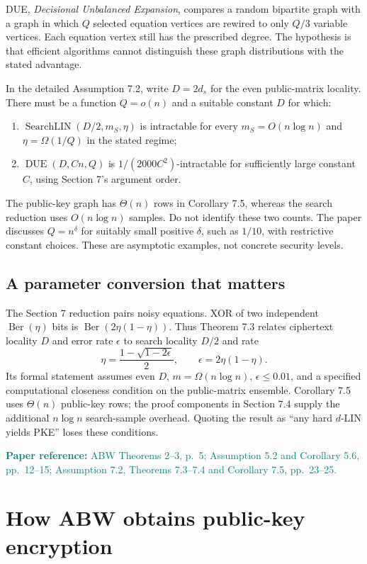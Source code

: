 \documentclass[11pt,a4paper]{article}
\newcommand{\Ber}{\operatorname{Ber}}
\newcommand{\readref}[1]{\textcolor{teal}{\small\textbf{Paper reference:} #1}}
\begin{document}
DUE, \emph{Decisional Unbalanced Expansion}, compares a random bipartite graph with a graph in which $Q$ selected equation vertices are rewired to only $Q/3$ variable vertices. Each equation vertex still has the prescribed degree. The hypothesis is that efficient algorithms cannot distinguish these graph distributions with the stated advantage.

In the detailed Assumption 7.2, write $D=2d_s$ for the even public-matrix locality. There must be a function $Q=o(n)$ and a suitable constant $D$ for which:
\begin{enumerate}
\item $\operatorname{SearchLIN}(D/2,m_S,\eta)$ is intractable for every $m_S=O(n\log n)$ and $\eta=\Omega(1/Q)$ in the stated regime;
\item $\operatorname{DUE}(D,Cn,Q)$ is $1/(2000C^2)$-intractable for sufficiently large constant $C$, using Section 7's argument order.
\end{enumerate}
The public-key graph has $\Theta(n)$ rows in Corollary 7.5, whereas the search reduction uses $O(n\log n)$ samples. Do not identify these two counts. The paper discusses $Q=n^\delta$ for suitably small positive $\delta$, such as $1/10$, with restrictive constant choices. These are asymptotic examples, not concrete security levels.

\subsection{A parameter conversion that matters}
The Section 7 reduction pairs noisy equations. XOR of two independent $\Ber(\eta)$ bits is $\Ber(2\eta(1-\eta))$. Thus Theorem 7.3 relates ciphertext locality $D$ and error rate $\epsilon$ to search locality $D/2$ and rate
\begin{equation}
 \eta=\frac{1-\sqrt{1-2\epsilon}}2,\qquad \epsilon=2\eta(1-\eta).
\end{equation}
Its formal statement assumes even $D$, $m=\Omega(n\log n)$, $\epsilon\leq0.01$, and a specified computational closeness condition on the public-matrix ensemble. Corollary 7.5 uses $\Theta(n)$ public-key rows; the proof components in Section 7.4 supply the additional $n\log n$ search-sample overhead. Quoting the result as ``any hard $d$-LIN yields PKE'' loses these conditions.

\readref{ABW Theorems 2--3, p.~5; Assumption 5.2 and Corollary 5.6, pp.~12--15; Assumption 7.2, Theorems 7.3--7.4 and Corollary 7.5, pp.~23--25.}

\section{How ABW obtains public-key encryption}\label{sec:pke}
\end{document}
